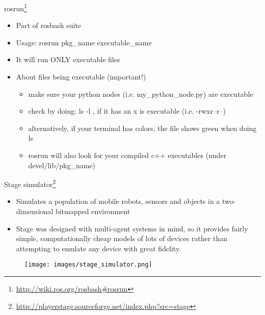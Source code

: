 \documentclass{beamer}
\begin{document}

\begin{frame}{rosrun\footnote{\url{http://wiki.ros.org/rosbash\#rosrun}}}
	\begin{itemize}
		\item Part of rosbash suite
		\item Usage: rosrun pkg\_name executable\_name
		\item It will run ONLY executable files
		\item About files being executable (important!)
		\begin{itemize}
			\item make sure your python nodes (i.e. my\_python\_node.py) are executable
			\item check by doing: ls -l , if it has an x is executable (i.e. -rwxr--r--)
			\item alternatively, if your terminal has colors, the file shows green when doing ls
			\item rosrun will also look for your compiled c++ executables (under devel/lib/pkg\_name)
		\end{itemize}
	\end{itemize}
	
\end{frame}


\begin{frame}{Stage simulator\footnote{\url{http://playerstage.sourceforge.net/index.php?src=stage}}}
	\begin{itemize}
		\item Simulates a population of mobile robots, sensors and objects in a two-dimensional bitmapped environment
		\item Stage was designed with multi-agent systems in mind, so it provides fairly simple, computationally cheap models of lots of devices rather than attempting to emulate any device with great fidelity. 
	\end{itemize}
	
	\begin{figure}[H]
		\centering
		\texttt{[image: images/stage\_simulator.png]}
	\end{figure}
	
\end{frame}

\end{document}
